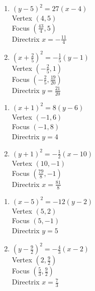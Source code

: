 \begin{multicols}{2}
\begin{enumerate}
\setcounter{enumi}{\value{HW}}


\item $(y - 5)^{2} = 27(x - 4)$\\
Vertex $(4, 5)$\\
Focus $\left( \frac{43}{4}, 5 \right)$\\
Directrix $x = -\frac{11}{4}$

\item $\left(x + \frac{2}{5} \right)^{2} = -\frac{1}{5}(y - 1)$\\
Vertex $\left( -\frac{2}{5}, 1 \right)$\\
Focus $\left( -\frac{2}{5}, \frac{19}{20} \right)$\\
Directrix $y = \frac{21}{20}$

\setcounter{HW}{\value{enumi}}
\end{enumerate}
\end{multicols}

\begin{multicols}{2}
\begin{enumerate}
\setcounter{enumi}{\value{HW}}


\item  $(x+1)^2=8(y-6)$ \\
Vertex $(-1,6)$\\
Focus $(-1,8)$ \\
Directrix $y=4$

\item  $(y+1)^2=-\frac{1}{2}(x-10)$\\
Vertex $(10,-1)$\\
Focus $\left(\frac{79}{8}, -1 \right)$\\
Directrix $x = \frac{81}{8}$

\setcounter{HW}{\value{enumi}}
\end{enumerate}
\end{multicols}

\begin{multicols}{2}
\begin{enumerate}
\setcounter{enumi}{\value{HW}}

\item $(x-5)^2 = -12(y-2)$\\
Vertex $(5,2)$\\
Focus $(5,-1)$ \\
Directrix $y=5$


\item  $\left(y-\frac{9}{2}\right)^2 = -\frac{4}{3} (x-2)$\\
Vertex $\left(2, \frac{9}{2}\right)$\\
Focus $\left(\frac{5}{3}, \frac{9}{2}\right)$\\
Directrix $x = \frac{7}{3}$

\setcounter{HW}{\value{enumi}}
\end{enumerate}
\end{multicols}

